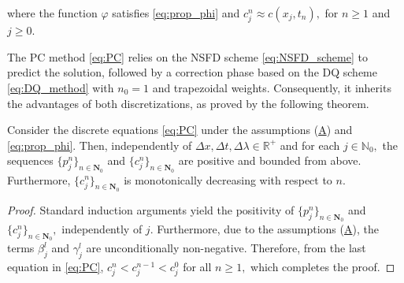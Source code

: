 \documentclass[a4paper, UKenglish, numberwithinsect, thm-restate]{tgdk-v2021}
\begin{document}
where the function $\varphi$ satisfies \eqref{eq:prop_phi} and $c_j^n\approx c(x_j,t_n),$ for $n\geq 1$ and $j\geq 0.$

The PC method \eqref{eq:PC} relies on the NSFD scheme \eqref{eq:NSFD_scheme} to predict the solution, followed by a correction phase based on the DQ scheme \eqref{eq:DQ_method} with $n_0=1$ and trapezoidal weights. Consequently, it inherits the advantages of both discretizations, as proved by the following theorem. 

\begin{theorem}\label{thm:PC_Dynamic_Consistency}
    Consider the discrete equations \eqref{eq:PC} under the assumptions (\hyperref[ass:1]{A}) and \eqref{eq:prop_phi}. Then, independently of $\Delta x, \Delta t, \Delta \lambda\in \mathbb{R}^+$ and for each $j\in \mathbb{N}_0,$ the sequences $\{ p_j^n \}_{n\in \mathbf{N}_0}$ and $\{ c_j^n \}_{n\in \mathbf{N}_0}$ are positive and bounded from above. Furthermore, $\{ c_j^n \}_{n\in \mathbf{N}_0}$ is monotonically decreasing with respect to $n$.
\end{theorem}
\begin{proof}
     Standard induction arguments yield the positivity of $\{ p_j^n \}_{n\in \mathbf{N}_0}$ and $\{ c_j^n \}_{n\in \mathbf{N}_0},$ independently of $j.$ Furthermore, due to the assumptions (\hyperref[ass:1]{A}), the terms $\beta_{j}^{l}$ and $\gamma_{j}^{l}$ are unconditionally non-negative. Therefore, from the last equation in \eqref{eq:PC}, $c_j^n<c_j^{n-1}<c_j^0$ for all $n\geq 1,$ which completes the proof.
\end{proof}
\end{document}
